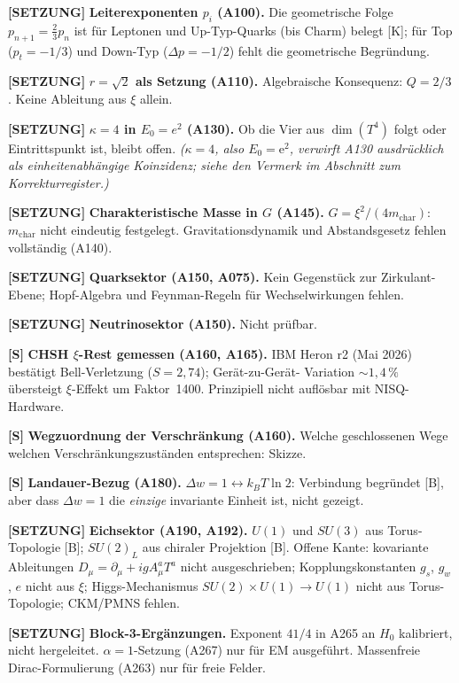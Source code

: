 \textbf{[SETZUNG]} \textbf{Leiterexponenten $p_i$ (A100).}
Die geometrische Folge $p_{n+1}=\tfrac23p_n$ ist für Leptonen und Up-Typ-Quarks
(bis Charm) belegt [K]; für Top ($p_t=-1/3$) und Down-Typ ($\Delta p=-1/2$)
fehlt die geometrische Begründung.

\textbf{[SETZUNG]} \textbf{$r=\sqrt2$ als Setzung (A110).}
Algebraische Konsequenz: $Q=2/3$. Keine Ableitung aus $\xi$ allein.

\textbf{[SETZUNG]} \textbf{$\kappa=4$ in $E_0=e^2$ (A130).}
Ob die Vier aus $\dim(T^4)$ folgt oder Eintrittspunkt ist, bleibt offen. \textit{($\kappa=4$, also $E_0=\mathrm{e}^2$, verwirft A130 ausdrücklich als einheitenabhängige Koinzidenz; siehe den Vermerk im Abschnitt zum Korrekturregister.)}

\textbf{[SETZUNG]} \textbf{Charakteristische Masse in $G$ (A145).}
$G=\xi^2/(4m_\text{char})$: $m_\text{char}$ nicht eindeutig festgelegt.
Gravitationsdynamik und Abstandsgesetz fehlen vollständig (A140).

\textbf{[SETZUNG]} \textbf{Quarksektor (A150, A075).}
Kein Gegenstück zur Zirkulant-Ebene; Hopf-Algebra und Feynman-Regeln für
Wechselwirkungen fehlen.

\textbf{[SETZUNG]} \textbf{Neutrinosektor (A150).} Nicht prüfbar.

\textbf{[S]} \textbf{CHSH $\xi$-Rest gemessen (A160, A165).}
IBM Heron r2 (Mai 2026) bestätigt Bell-Verletzung ($S=2{,}74$); Gerät-zu-Gerät-
Variation $\sim1{,}4\,\%$ übersteigt $\xi$-Effekt um Faktor~1400. Prinzipiell
nicht auflösbar mit NISQ-Hardware.

\textbf{[S]} \textbf{Wegzuordnung der Verschränkung (A160).}
Welche geschlossenen Wege welchen Verschränkungszuständen entsprechen: Skizze.

\textbf{[S]} \textbf{Landauer-Bezug (A180).}
$\Delta w=1\leftrightarrow k_BT\ln2$: Verbindung begründet [B], aber dass
$\Delta w=1$ die \emph{einzige} invariante Einheit ist, nicht gezeigt.

\textbf{[SETZUNG]} \textbf{Eichsektor (A190, A192).}
$U(1)$ und $SU(3)$ aus Torus-Topologie [B]; $SU(2)_L$ aus chiraler Projektion
[B]. Offene Kante: kovariante Ableitungen $D_\mu=\partial_\mu+igA_\mu^aT^a$
nicht ausgeschrieben; Kopplungskonstanten $g_s$, $g_w$, $e$ nicht aus $\xi$;
Higgs-Mechanismus $SU(2)\times U(1)\to U(1)$ nicht aus Torus-Topologie;
CKM/PMNS fehlen.

\textbf{[SETZUNG]} \textbf{Block-3-Ergänzungen.} Exponent $41/4$ in A265 an
$H_0$ kalibriert, nicht hergeleitet. $\alpha=1$-Setzung (A267) nur für EM
ausgeführt. Massenfreie Dirac-Formulierung (A263) nur für freie Felder.

